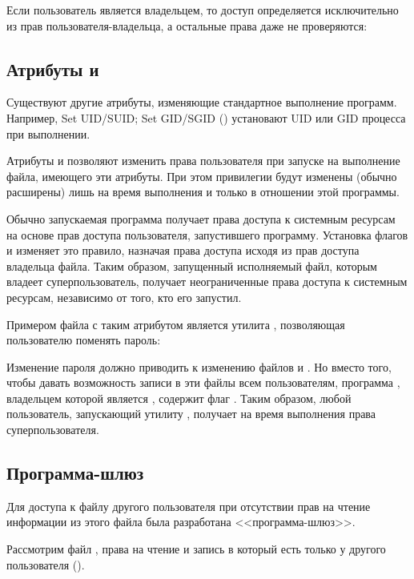 Если пользователь является владельцем, то доступ определяется исключительно из прав пользователя-владельца, а остальные права даже не проверяются:


\subsection{Атрибуты  и }

Существуют другие атрибуты, изменяющие стандартное выполнение программ. Например, Set UID/SUID; Set GID/SGID () установают UID или GID процесса при выполнении.

Атрибуты  и  позволяют изменить права пользователя при запуске на выполнение файла, имеющего эти атрибуты. При этом привилегии будут изменены (обычно расширены) лишь на время выполнения и только в отношении этой программы.

Обычно запускаемая программа получает права доступа к системным ресурсам на основе прав доступа пользователя, запустившего программу. Установка флагов  и  изменяет это правило, назначая права доступа исходя из прав доступа владельца файла. Таким образом, запущенный исполняемый файл, которым владеет суперпользователь, получает неограниченные права доступа к системным ресурсам, независимо от того, кто его запустил.

Примером файла с таким атрибутом является утилита , позволяющая пользователю поменять пароль:


Изменение пароля должно приводить к изменению файлов  и . Но вместо того, чтобы давать возможность записи в эти файлы всем пользователям, программа , владельцем которой является , содержит флаг . Таким образом, любой пользователь, запускающий утилиту , получает на время выполнения права суперпользователя.

\subsection{Программа-шлюз}

Для доступа к файлу другого пользователя при отсутствии прав на чтение информации из этого файла была разработана <<программа-шлюз>>. 

Рассмотрим файл , права на чтение и запись в который есть только у другого пользователя ().


